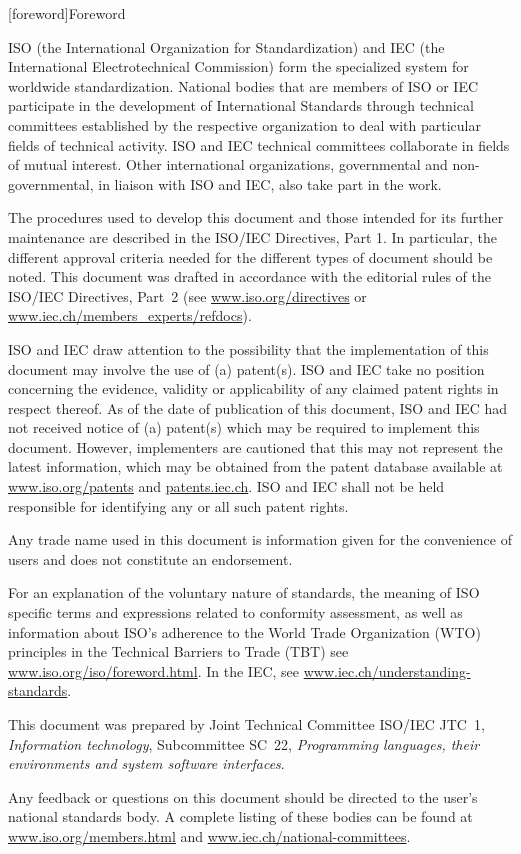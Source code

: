 
[foreword]{Foreword}

ISO (the International Organization for Standardization) and IEC (the International Electrotechnical Commission) form the specialized system for worldwide standardization. National bodies that are members of ISO or IEC participate in the development of International Standards through technical committees established by the respective organization to deal with particular fields of technical activity. ISO and IEC technical committees collaborate in fields of mutual interest. Other international organizations, governmental and non-governmental, in liaison with ISO and IEC, also take part in the work.

The procedures used to develop this document and those intended for its further maintenance are described in the ISO/IEC Directives, Part 1. In particular, the different approval criteria needed for the different types of document should be noted. This document was drafted in accordance with the editorial rules of the ISO/IEC Directives, Part 2 (see \href{www.iso.org/directives}{www.iso.org/directives} 
or 
\href{www.iec.ch/members_experts/refdocs}{www.iec.ch/members_experts/refdocs}).

ISO and IEC draw attention to the possibility that the implementation of this document may involve the use of (a) patent(s). ISO and IEC take no position concerning the evidence, validity or applicability of any claimed patent rights in respect thereof. As of the date of publication of this document, ISO and IEC had not received notice of (a) patent(s) which may be required to implement this document. However, implementers are cautioned that this may not represent the latest information, which may be obtained from the patent database available at \href{www.iso.org/patents}{www.iso.org/patents} 
and 
\href{patents.iec.ch/}{patents.iec.ch}. 
ISO and IEC shall not be held responsible for identifying any or all such patent rights.

Any trade name used in this document is information given for the convenience of users and does not constitute an endorsement.

For an explanation of the voluntary nature of standards, the meaning of ISO specific terms and expressions related to conformity assessment, as well as information about ISO's adherence to the World Trade Organization (WTO) principles in the Technical Barriers to Trade (TBT) see \href{www.iso.org/iso/foreword.html/}{www.iso.org/iso/foreword.html}. In the IEC, see \href{www.iec.ch/understanding-standards/}{www.iec.ch/understanding-standards}.

This document was prepared by Joint Technical Committee ISO/IEC JTC 1, \emph{Information technology}, Subcommittee SC 22, \emph{Programming languages, their environments and system software interfaces}.

Any feedback or questions on this document should be directed to the user’s national standards body. A complete listing of these bodies can be found at \href{www.iso.org/members.html/}{www.iso.org/members.html} and \href{www.iec.ch/national-committees/}{www.iec.ch/national-committees}.
